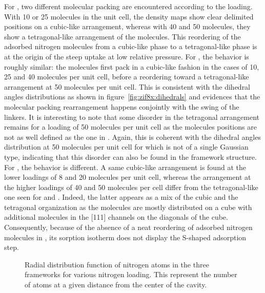\documentclass[thesis]{subfiles}
\begin{document}
For , two different molecular packing are encountered according to the
loading. With 10 or 25 molecules in the unit cell, the density maps show clear
delimited positions on a cubic-like arrangement, whereas with 40 and 50
molecules, they show a tetragonal-like arrangement of the molecules. This
reordering of the adsorbed nitrogen molecules from a cubic-like phase to a
tetragonal-like phase is at the origin of the steep uptake at low relative
pressure. For \ZIFCl, the behavior is roughly similar: the molecules first pack
in a cubic-like fashion in the cases of 10, 25 and 40 molecules per unit cell,
before a reordering toward a tetragonal-like arrangement at 50 molecules per
unit cell. This is consistent with the dihedral angles distributions as shown in
figure~\ref{fig:zif8x:dihedrals} and evidences that the molecular packing
rearrangement happens conjointly with the swing of the linkers. It is
interesting to note that some disorder in the tetragonal arrangement remains for
a loading of 50 molecules per unit cell as the molecules positions are not as
well defined as the one in . Again, this is coherent with the dihedral
angles distribution at 50 molecules per unit cell for \ZIFCl which is not of a
single Gaussian type, indicating that this disorder can also be found in the
framework structure. For \ZIFBr, the behavior is different. A same cubic-like
arrangement is found at the lower loadings of 8 and 20 molecules per unit cell,
whereas the arrangement at the higher loadings of 40 and 50 molecules per cell
differ from the tetragonal-like one seen for  and \ZIFCl. Indeed, the
latter appears as a mix of the cubic and the tetragonal organization as the
molecules are mostly distributed on a cube with additional molecules in the
[111] channels on the diagonals of the cube. Consequently, because of the
absence of a neat reordering of adsorbed nitrogen molecules in \ZIFBr, its
sorption isotherm does not display the S-shaped adsorption step.

\begin{figure}[ht]
    \centering
    
    \caption{Radial distribution function of nitrogen atoms in the three
    frameworks for various nitrogen loading. This represent the number of atoms
    at a given distance from the center of the cavity.}
    \label{fig:zif8x:rdf}
\end{figure}
\end{document}
